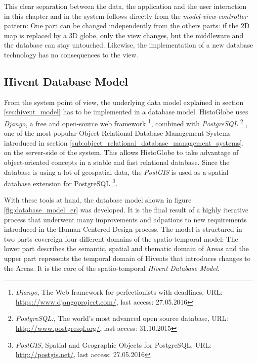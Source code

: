 This clear separation between the data, the application and the user interaction in this chapter and in the system follows directly from the \emph{model-view-controller} pattern: One part can be changed independently from the others parts: if the 2D map is replaced by a 3D globe, only the view changes, but the middleware and the database can stay untouched. Likewise, the implementation of a new database technology has no consequences to the view.


\subsection{Hivent Database Model} %
\label{sub:database_model}

From the system point of view, the underlying data model explained in section \ref{sec:hivent_model} has to be implemented in a database model. HistoGlobe uses \emph{Django}, a free and open-source web framework
\footnote{
  \emph{Django},
  The Web framework for perfectionists with deadlines,
  URL: \url{https://www.djangoproject.com/},
  last access: 27.05.2016
},
combined with \emph{PostgreSQL}
\footnote{
  \emph{PostgreSQL:},
  The world's most advanced open source database,
  URL: \url{http://www.postgresql.org/},
  last access: 31.10.2015
}
, one of the most popular Object-Relational Database Management Systems introduced in section \ref{sub:object_relational_database_management_systems}, on the server-side of the system. This allows HistoGlobe to take advantage of object-oriented concepts in a stable and fast relational database. Since the database is using a lot of geospatial data, the \emph{PostGIS} is used as a spatial database extension for PostgreSQL
\footnote{
  \emph{PostGIS},
  Spatial and Geographic Objects for PostgreSQL,
  URL: \url{http://postgis.net/},
  last access: 27.05.2016
}.

With these tools at hand, the database model shown in figure \ref{fig:database_model_er} was developed. It is the final result of a highly iterative process that underwent many improvements and adpations to new requirements introduced in the Human Centered Design process. The model is structured in two parts covereign four different domains of the spatio-temporal model: The lower part describes the semantic, spatial and thematic domain of Areas and the upper part represents the temporal domain of Hivents that introduces changes to the Areas. It is the core of the spatio-temporal \emph{Hivent Database Model}.

